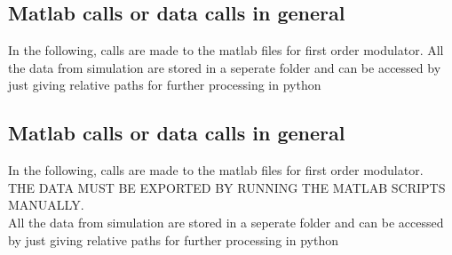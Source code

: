 \documentclass[
  letterpaper,
  DIV=11,
  numbers=noendperiod]{scrartcl}
\begin{document}
\subsection{Matlab calls or data calls in
general}\label{matlab-calls-or-data-calls-in-general}

In the following, calls are made to the matlab files for first order
modulator. All the data from simulation are stored in a seperate folder
and can be accessed by just giving relative paths for further processing
in python

\subsection{Matlab calls or data calls in
general}\label{matlab-calls-or-data-calls-in-general-1}

In the following, calls are made to the matlab files for first order
modulator.\\
THE DATA MUST BE EXPORTED BY RUNNING THE MATLAB SCRIPTS MANUALLY.\\
All the data from simulation are stored in a seperate folder and can be
accessed by just giving relative paths for further processing in python
\end{document}
